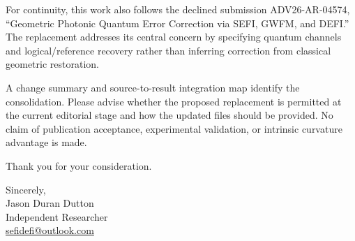 \documentclass[11pt,letterpaper]{article}
\begin{document}
For continuity, this work also follows the declined submission ADV26-AR-04574, ``Geometric Photonic Quantum Error Correction via SEFI, GWFM, and DEFI.'' The replacement addresses its central concern by specifying quantum channels and logical/reference recovery rather than inferring correction from classical geometric restoration.

A change summary and source-to-result integration map identify the consolidation. Please advise whether the proposed replacement is permitted at the current editorial stage and how the updated files should be provided. No claim of publication acceptance, experimental validation, or intrinsic curvature advantage is made.

Thank you for your consideration.

Sincerely,\\Jason Duran Dutton\\Independent Researcher\\
\href{mailto:sefidefi@outlook.com}{sefidefi@outlook.com}
\end{document}
